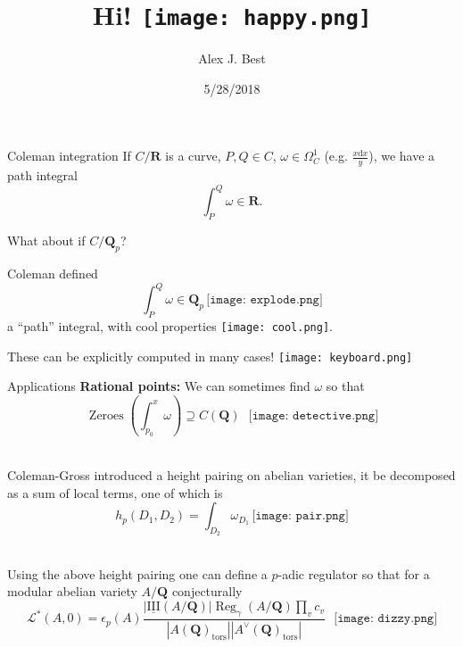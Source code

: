 \documentclass[notheorems]{beamer}
\author{Alex J. Best}
\institute{Boston University}
\date{5/28/2018}
\title{Hi! \texttt{[image: happy.png]}}
\theoremstyle{plain}
\theoremstyle{definition}
\theoremstyle{definition}
\theoremstyle{definition}
\newcommand{\QQ}{\mathbf{Q}}
\newcommand{\RR}{\mathbf{R}}
\newcommand{\diff}{\mathrm{d}}
\begin{document}
\maketitle


\begin{frame}{Coleman integration}
    If \(C/\RR\) is a curve, \(P,Q \in C\), \(\omega \in \Omega^1_C\) (e.g. \(\frac{x \diff x}{y}\)), we have a path integral
    \[\int_P^Q \omega\in \RR\text{.}\]
    \pause%

    What about if \(C/\QQ_p\)?

    Coleman defined
    \[\int^Q_P \omega\in \QQ_p\,\texttt{[image: explode.png]}\]
    \pause%
    a ``path'' integral, with cool properties \texttt{[image: cool.png]}.

    \pause%

    These can be explicitly computed in many cases! \texttt{[image: keyboard.png]}
\end{frame}

\begin{frame}{Applications}
    \textbf{Rational points:}
    We can sometimes find \(\omega\) so that
    \[\operatorname{Zeroes}\left( \int_{p_0}^x \omega\right) \supseteq C(\QQ)\text{ }\texttt{[image: detective.png]}\]

     \\
    Coleman-Gross introduced a height pairing on abelian varieties, it be decomposed as a sum of local terms, one of which is
    \[h_p(D_1,D_2) = \int_{D_2} \omega_{D_1}\,\texttt{[image: pair.png]}\]

     \\
    Using the above height pairing one can define a \(p\)-adic regulator so that for a modular abelian variety \(A/\QQ\) conjecturally
    \[\mathcal L^* (A,0)  = \epsilon_p(A)\frac{|\underline{\mathrm{III}}(A/\QQ)|\operatorname{Reg}_{\gamma}(A/\QQ)\prod_v c_v}{|A(\QQ)_{\text{tors}}||A^ \vee(\QQ)_{\text{tors}}|}\text{ } \texttt{[image: dizzy.png]}\]

\end{frame}
\end{document}
